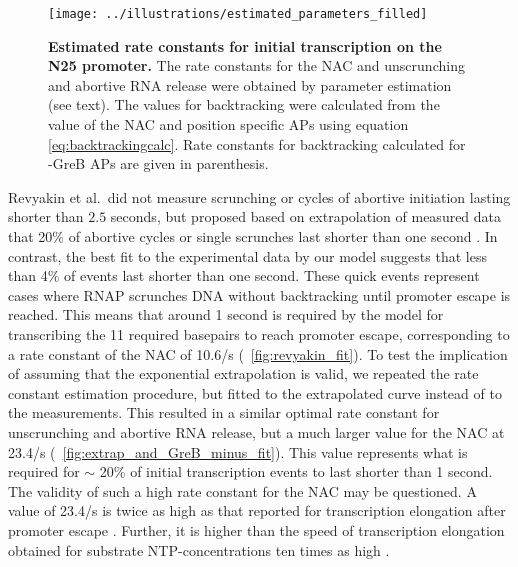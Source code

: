 \begin{figure}[h]
    \begin{center}
      \texttt{[image: ../illustrations/estimated\_parameters\_filled]}
    \end{center}
    \caption{ {\bf Estimated rate constants for initial transcription on the N25
      promoter.} The rate constants for the NAC and unscrunching and abortive
      RNA release were obtained by parameter estimation (see text). The values
      for backtracking were calculated from the value of the NAC and position
      specific APs using equation \eqref{eq:backtrackingcalc}. Rate constants
      for backtracking calculated for -GreB APs are given in parenthesis.}
    \label{fig:estimated_parameters}
\end{figure}

Revyakin et al.\ did not measure scrunching or cycles of abortive initiation
lasting shorter than $2.5$ seconds, but proposed based on extrapolation of
measured data that 20\% of abortive cycles or single scrunches last shorter
than one second \cite{revyakin_abortive_2006}. In contrast, the best fit to
the experimental data by our model suggests that less than 4\% of events last
shorter than one second. These quick events represent cases where RNAP
scrunches DNA without backtracking until promoter escape is reached. This
means that around 1 second is required by the model for transcribing
the 11 required basepairs to reach promoter escape, corresponding to a
rate constant of the NAC of 10.6/s (\FIG~\ref{fig:revyakin_fit}). To test the
implication of assuming that the exponential extrapolation is valid, we
repeated the rate constant estimation procedure, but fitted to the
extrapolated curve instead of to the measurements. This resulted in a similar
optimal rate constant for unscrunching and abortive RNA release, but a much
larger value for the NAC at 23.4/s (\FIG~\ref{fig:extrap_and_GreB_minus_fit}).
This value represents what is required for $\sim$ 20\% of initial
transcription events to last shorter than 1 second. The validity of such a
high rate constant for the NAC may be questioned. A value of 23.4/s is twice
as high as that reported for transcription elongation after promoter escape
\cite{revyakin_abortive_2006}. Further, it is higher than the speed of
transcription elongation obtained for substrate NTP-concentrations ten times
as high \cite{bai_mechanochemical_2007}.

